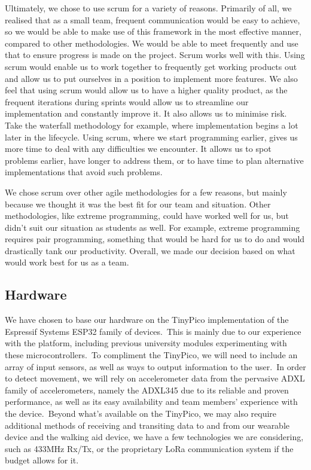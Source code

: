             Ultimately, we chose to use scrum for a variety of reasons.
            Primarily of all, we realised that as a small team, frequent communication would be easy to achieve, so we
            would be able to make use of this framework in the most effective manner, compared to other methodologies.
            We would be able to meet frequently and use that to ensure progress is made on the project. Scrum works well
            with this. Using scrum would enable us to work together to frequently get working products out and allow us
            to put ourselves in a position to implement more features. We also feel that using scrum would allow us to
            have a higher quality product, as the frequent iterations during sprints would allow us to streamline our
            implementation and constantly improve it. It also allows us to minimise risk. Take the waterfall methodology
            for example, where implementation begins a lot later in the lifecycle. Using scrum, where we start
            programming earlier, gives us more time to deal with any difficulties we encounter. It allows us to spot
            problems earlier, have longer to address them, or to have time to plan alternative implementations that
            avoid such problems. 
            
            We chose scrum over other agile methodologies for a few reasons, but mainly because we
            thought it was the best fit for our team and situation. Other methodologies, like extreme programming, could
            have worked well for us, but didn’t suit our situation as students as well. For example, extreme programming
            requires pair programming, something that would be hard for us to do and would drastically tank our
            productivity. Overall, we made our decision based on what would work best for us as a team.

    
        \subsection{Hardware}
            We have chosen to base our hardware on the TinyPico implementation of the Espressif Systems ESP32 family of
            devices.\ This is mainly due to our experience with the platform, including previous university modules
            experimenting with these microcontrollers.\ To compliment the TinyPico, we will need to include an array of
            input sensors, as well as ways to output information to the user.\ In order to detect movement, we will rely
            on accelerometer data from the pervasive ADXL family of accelerometers, namely the ADXL345 due to its
            reliable and proven performance, as well as its easy availability and team members' experience with the
            device.\ Beyond what's available on the TinyPico, we may also require additional methods of receiving and
            transiting data to and from our wearable device and the walking aid device, we have a few technologies we
            are considering, such as 433MHz Rx/Tx, or the proprietary LoRa communication system if the budget allows for
            it.

